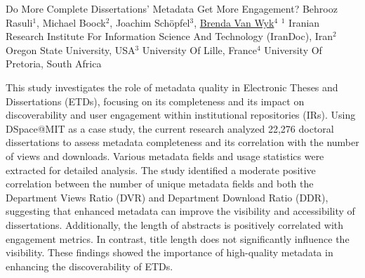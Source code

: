 
    \begin{abstract_online}{Do More Complete Dissertations’ Metadata Get More Engagement?}{%
        Behrooz Rasuli$^{1}$, Michael Boock$^{2}$, Joachim Schöpfel$^{3}$, \underline{Brenda Van Wyk}$^{4}$}{%
        }{%
        $^1$ Iranian Research Institute For Information Science And Technology (IranDoc), Iran\newline{}$^2$ Oregon State University, USA\newline{}$^3$ University Of Lille, France\newline{}$^4$ University Of Pretoria, South Africa}
    
    This study investigates the role of metadata quality in Electronic Theses and Dissertations (ETDs), focusing on its completeness and its impact on discoverability and user engagement within institutional repositories (IRs). Using DSpace@MIT as a case study, the current research analyzed 22,276 doctoral dissertations to assess metadata completeness and its correlation with the number of views and downloads. Various metadata fields and usage statistics were extracted for detailed analysis. The study identified a moderate positive correlation between the number of unique metadata fields and both the Department Views Ratio (DVR) and Department Download Ratio (DDR), suggesting that enhanced metadata can improve the visibility and accessibility of dissertations. Additionally, the length of abstracts is positively correlated with engagement metrics. In contrast, title length does not significantly influence the visibility. These findings showed the importance of high-quality metadata in enhancing the discoverability of ETDs.
\end{abstract_online}

    
